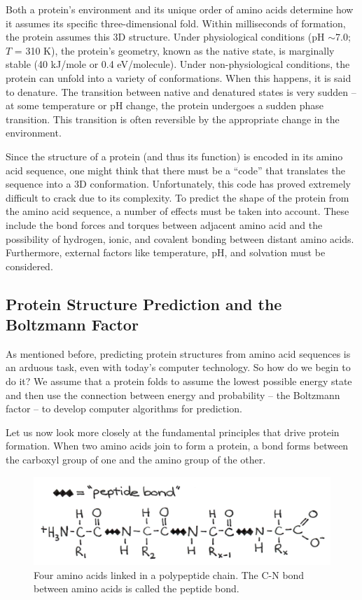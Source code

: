 Both a protein's environment and its unique order of amino acids determine how it assumes its specific three-dimensional fold.  Within milliseconds of formation, the protein assumes this 3D structure.  Under physiological conditions (pH $\sim$7.0; $T$ = 310 K), the protein's geometry, known as the native state, is marginally stable (40 kJ/mole or 0.4 eV/molecule).  Under non-physiological conditions, the protein can unfold into a variety of conformations.  When this happens, it is said to denature.  The transition between native and denatured states is very sudden -- at some temperature or pH change, the protein undergoes a sudden phase transition.  This transition is often reversible by the appropriate change in the environment.
  
Since the structure of a protein (and thus its function) is encoded in its amino acid sequence, one might think that there must be a ``code'' that translates the sequence into a 3D conformation.  Unfortunately, this code has proved extremely difficult to crack due to its complexity.  To predict the shape of the protein from the amino acid sequence, a number of effects must be taken into account.  These include the bond forces and torques between adjacent amino acid and the possibility of hydrogen, ionic, and covalent bonding between distant amino acids.  Furthermore, external factors like temperature, pH, and solvation must be considered.

\subsection{Protein Structure Prediction and the Boltzmann Factor}

As mentioned before, predicting protein structures from amino acid sequences is an arduous task, even with today’s computer technology.  So how do we begin to do it?  We assume that a protein folds to assume the lowest possible energy state and then use the connection between energy and probability -- the Boltzmann factor -- to develop computer algorithms for prediction.    

Let us now look more closely at the fundamental principles that drive protein formation.  When two amino acids join to form a protein, a bond forms between the carboxyl group of one and the amino group of the other.    
\begin{figure}[htb]
 	\centering
 	\includegraphics[width=\textwidth]{./figures/Topic8/Fig8-5.jpg}
 	\caption{Four amino acids linked in a polypeptide chain.  The C-N bond between amino acids is called the peptide bond.}
  	\label{Fig8-5}
\end{figure}

